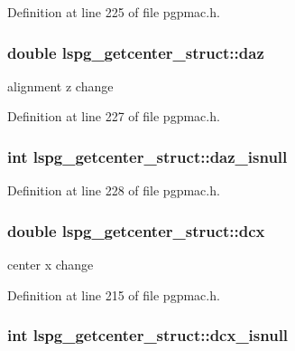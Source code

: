 Definition at line 225 of file pgpmac.\-h.

\hypertarget{structlspg__getcenter__struct_a1170bab2161f03ab29c39f79519ed9ae}{
\subsubsection[{daz}]{\setlength{\rightskip}{0pt plus 5cm}double lspg\-\_\-getcenter\-\_\-struct\-::daz}}\label{structlspg__getcenter__struct_a1170bab2161f03ab29c39f79519ed9ae}


alignment z change 



Definition at line 227 of file pgpmac.\-h.

\hypertarget{structlspg__getcenter__struct_a36742b6bd0f4bf9356414930ba893617}{
\subsubsection[{daz\-\_\-isnull}]{\setlength{\rightskip}{0pt plus 5cm}int lspg\-\_\-getcenter\-\_\-struct\-::daz\-\_\-isnull}}\label{structlspg__getcenter__struct_a36742b6bd0f4bf9356414930ba893617}


Definition at line 228 of file pgpmac.\-h.

\hypertarget{structlspg__getcenter__struct_ade0534056296e9ed568404c538be9227}{
\subsubsection[{dcx}]{\setlength{\rightskip}{0pt plus 5cm}double lspg\-\_\-getcenter\-\_\-struct\-::dcx}}\label{structlspg__getcenter__struct_ade0534056296e9ed568404c538be9227}


center x change 



Definition at line 215 of file pgpmac.\-h.

\hypertarget{structlspg__getcenter__struct_aa404da85af654998f039c81a77626748}{
\subsubsection[{dcx\-\_\-isnull}]{\setlength{\rightskip}{0pt plus 5cm}int lspg\-\_\-getcenter\-\_\-struct\-::dcx\-\_\-isnull}}\label{structlspg__getcenter__struct_aa404da85af654998f039c81a77626748}


